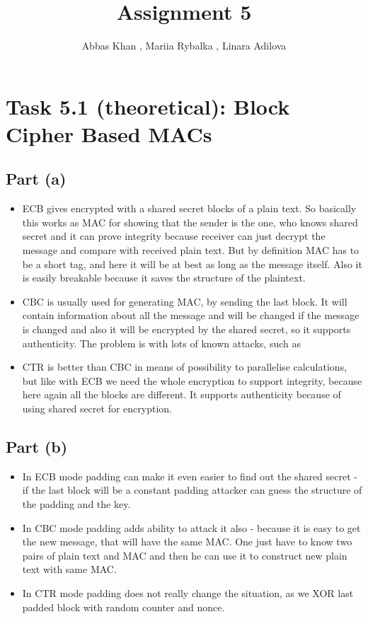 \documentclass{article}
\title{Assignment 5}
\author{Abbas Khan , Mariia Rybalka , Linara Adilova}
\begin{document}
\maketitle 

\section*{Task 5.1 (theoretical): Block Cipher Based MACs}
\subsection*{Part (a)}
\begin{itemize}
\item ECB gives encrypted with a shared secret blocks of a plain text. So basically this works as MAC for showing that the sender is the one, who knows shared secret and it can prove integrity because receiver can just decrypt the message and compare with received plain text. But by definition MAC has to be a short tag, and here it will be at best as long as the message itself. Also it is easily breakable because it saves the structure of the plaintext.
\item CBC is usually used for generating MAC, by sending the last block. It will contain information about all the message and will be changed if the message is changed and also it will be encrypted by the shared secret, so it supports authenticity. The problem is with lots of known attacks, such as 
\item CTR is better than CBC in means of possibility to parallelise calculations, but like with ECB we need the whole encryption to support integrity, because here again all the blocks are different. It supports authenticity  because of using shared secret for encryption. 
\end{itemize}
\subsection*{Part (b)}
\begin{itemize}
\item In ECB mode padding can make it even easier to find out the shared secret - if the last block will be a constant padding attacker can guess the structure of the padding and the key.
\item In CBC mode padding adds ability to attack it also - because it is easy to get the new message, that will have the same MAC. One just have to know two pairs of plain text and MAC and then he can use it to construct new plain text with same MAC.
\item In CTR mode padding does not really change the situation, as we XOR last padded block with random counter and nonce.
\end{itemize}
\end{document}
